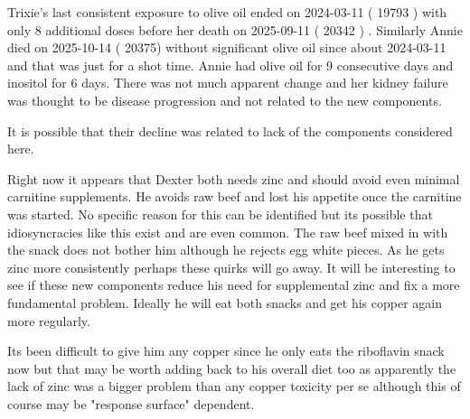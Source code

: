 
Trixie's last consistent exposure to olive oil ended on 2024-03-11 ( 19793 ) 
 with only
8 additional doses before her death on 2025-09-11 ( 20342 ) .
Similarly Annie died on 2025-10-14 ( 20375) without significant olive oil
since about 2024-03-11 and that was just for a shot time. 
Annie had olive oil for 9 consecutive days and inositol for 6 days.
There was not much apparent change and her kidney failure was
thought to be disease progression and not related to the new 
components. 


It is possible that their decline was related to lack of the
components considered here. 

Right now it appears that Dexter both needs zinc and should avoid
even minimal carnitine supplements. He avoids raw beef and lost
his appetite once the carnitine was started. No specific reason 
for this can be identified but its possible that idiosyncracies like
this exist and are even common.  The raw beef mixed in with the snack
does not bother him although he rejects egg white pieces. 
As he gets zinc more consistently perhaps these quirks will go away.
It will be interesting to see if these new components reduce his
need for supplemental zinc and fix a more fundamental problem. 
Ideally he will eat both snacks and get his copper again more regularly.


Its been difficult to give him any copper
since he only eats the riboflavin snack now but that may be worth
adding back to his overall diet too as apparently the lack of
zinc was a bigger problem than any  copper toxicity per se although
this of course may be "response surface" dependent. 


